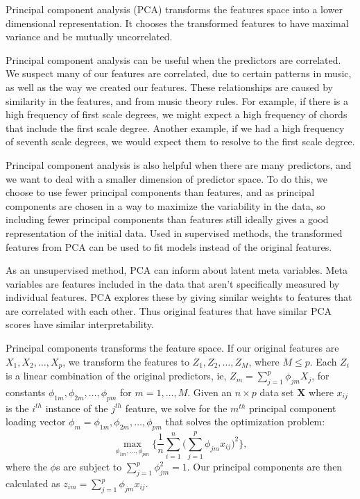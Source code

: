 \documentclass[12pt,twoside]{reedthesis}
\theoremstyle{definition}
\theoremstyle{definition}
\theoremstyle{definition}
\theoremstyle{remark}
\begin{document}
Principal component analysis (PCA) transforms the features space into a
lower dimensional representation. It chooses the transformed features to
have maximal variance and be mutually uncorrelated.

Principal component analysis can be useful when the predictors are
correlated. We suspect many of our features are correlated, due to
certain patterns in music, as well as the way we created our features.
These relationships are caused by similarity in the features, and from
music theory rules. For example, if there is a high frequency of first
scale degrees, we might expect a high frequency of chords that include
the first scale degree. Another example, if we had a high frequency of
seventh scale degrees, we would expect them to resolve to the first
scale degree.

Principal component analysis is also helpful when there are many
predictors, and we want to deal with a smaller dimension of predictor
space. To do this, we choose to use fewer principal components than
features, and as principal components are chosen in a way to maximize
the variability in the data, so including fewer principal components
than features still ideally gives a good representation of the initial
data. Used in supervised methods, the transformed features from PCA can
be used to fit models instead of the original features.

As an unsupervised method, PCA can inform about latent meta variables.
Meta variables are features included in the data that aren't
specifically measured by individual features. PCA explores these by
giving similar weights to features that are correlated with each other.
Thus original features that have similar PCA scores have similar
interpretability.

Principal components transforms the feature space. If our original
features are \(X_1,X_2,\ldots,X_p\), we transform the features to
\(Z_1,Z_2,\ldots,Z_M\), where \(M \leq p\). Each \(Z_i\) is a linear
combination of the original predictors, ie,
\(Z_m = \sum_{j = 1}^p \phi_{jm}X_j\), for constants
\(\phi_{1m},\phi_{2m},\ldots,\phi_{pm}\) for \(m = 1,\ldots,M\). Given
an \(n\times p\) data set \(\mathbf{X}\) where \(x_{ij}\) is the
\(i^{th}\) instance of the \(j^{th}\) feature, we solve for the
\(m^{th}\) principal component loading vector
\(\phi_m = \phi_{1m},\phi_{2m},\ldots,\phi_{pm}\) that solves the
optimization problem:
\[\max_{\phi_{1m},\ldots,\phi_{pm}} \bigg\{\frac{1}{n}\sum_{i=1}^n\bigg(\sum_{j=1}^p \phi_{jm}x_{ij}\bigg)^2\bigg\},\]
where the \(\phi\)s are subject to \(\sum_{j = 1}^p\phi_{jm}^2 = 1\).
Our principal components are then calculated as
\(z_{im} = \sum_{j = 1}^p\phi_{jm}x_{ij}\).
\end{document}

